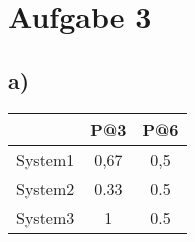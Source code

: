 \section*{Aufgabe 3}

\subsection*{a)}
\begin{tabular}{|c|c|c|}
\hline & P@3 & P@6\\
\hline System1 & 0,67 & 0,5 \\
\hline System2 & 0.33 & 0.5 \\
\hline System3 & 1 & 0.5 \\
\hline
\end{tabular}

\newpage
